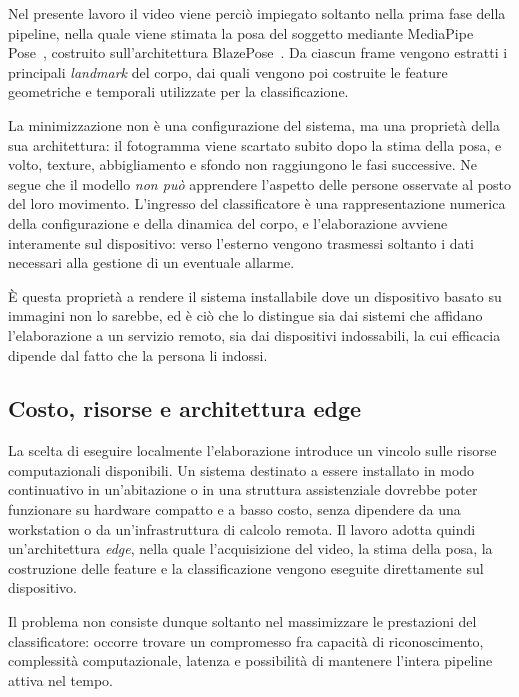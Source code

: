 Nel presente lavoro il video viene perciò impiegato soltanto nella prima fase
della pipeline, nella quale viene stimata la posa del soggetto mediante
MediaPipe Pose~\cite{mediapipe}, costruito sull'architettura
BlazePose~\cite{blazepose}. Da ciascun frame vengono estratti i principali
\emph{landmark} del corpo, dai quali vengono poi costruite le feature
geometriche e temporali utilizzate per la classificazione.

La minimizzazione non è una configurazione del sistema, ma una proprietà
della sua architettura: il fotogramma viene scartato subito dopo la stima
della posa, e volto, texture, abbigliamento e sfondo non raggiungono le fasi
successive. Ne segue che il modello \emph{non può} apprendere l'aspetto delle
persone osservate al posto del loro movimento. L'ingresso del classificatore
è una rappresentazione numerica della configurazione e della dinamica del
corpo, e l'elaborazione avviene interamente sul dispositivo: verso l'esterno
vengono trasmessi soltanto i dati necessari alla gestione di un eventuale
allarme.

È questa proprietà a rendere il sistema installabile dove un dispositivo
basato su immagini non lo sarebbe, ed è ciò che lo distingue sia dai sistemi
che affidano l'elaborazione a un servizio remoto, sia dai dispositivi
indossabili, la cui efficacia dipende dal fatto che la persona li indossi.

\subsection{Costo, risorse e architettura edge}

La scelta di eseguire localmente l'elaborazione introduce un vincolo sulle
risorse computazionali disponibili. Un sistema destinato a essere installato
in modo continuativo in un'abitazione o in una struttura assistenziale
dovrebbe poter funzionare su hardware compatto e a basso costo, senza
dipendere da una workstation o da un'infrastruttura di calcolo remota. Il
lavoro adotta quindi un'architettura \emph{edge}, nella quale l'acquisizione
del video, la stima della posa, la costruzione delle feature e la
classificazione vengono eseguite direttamente sul dispositivo.

Il problema non consiste dunque soltanto nel massimizzare le prestazioni del
classificatore: occorre trovare un compromesso fra capacità di
riconoscimento, complessità computazionale, latenza e possibilità di
mantenere l'intera pipeline attiva nel tempo.

